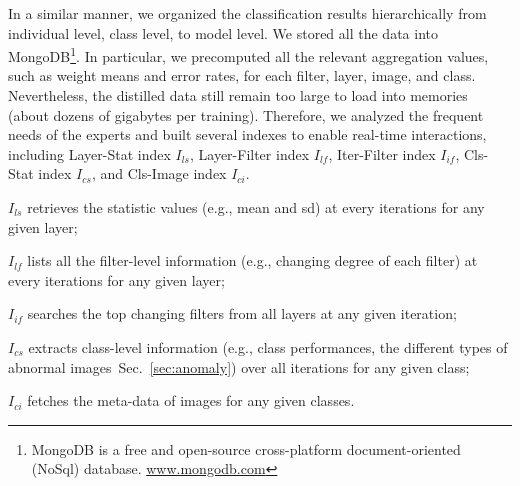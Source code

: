 \documentclass[format=acmsmall, review=false, screen=true]{acmart}
\newcommand{\ti}{\textcolor[rgb]{0,0,0}}
\begin{document}
\ti{
In a similar manner, we organized the classification results hierarchically from individual level, class level, to model level.
We stored all the data into MongoDB\footnote{MongoDB is a free and open-source cross-platform document-oriented (NoSql) database. \url{www.mongodb.com}}.
In particular, we precomputed all the relevant aggregation values, such as weight means and error rates, for each filter, layer, image, and class.
Nevertheless, the distilled data still remain too large to load into memories (about dozens of gigabytes per training).
Therefore, we analyzed the frequent needs of the experts and built several indexes to enable real-time interactions, including Layer-Stat index $I_{ls}$, Layer-Filter index $I_{lf}$, Iter-Filter index $I_{if}$, Cls-Stat index $I_{cs}$, and Cls-Image index $I_{ci}$.
\begin{compactitem}
	\item $I_{ls}$ retrieves the statistic values (e.g., mean and sd) at every iterations for any given layer;
	\item $I_{lf}$ lists all the filter-level information (e.g., changing degree of each filter) at every iterations for any given layer;
	\item $I_{if}$ searches the top changing filters from all layers at any given iteration;
	\item $I_{cs}$ extracts class-level information (e.g., class performances, the different types of abnormal images~Sec.~\ref{sec:anomaly}) over all iterations for any given class;
	\item $I_{ci}$ fetches the meta-data of images for any given classes.
\end{compactitem}
}
\end{document}

